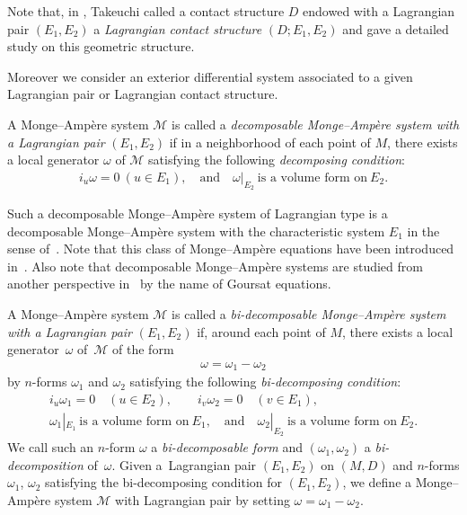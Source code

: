 \documentclass[pdftex]{sigma}
\begin{document}
Note that,
in \cite{Tak}, Takeuchi called
a contact structure $D$ endowed with a Lagrangian pair $(E_1,E_2)$
a {\it Lagrangian contact structure} $(D; E_1,E_2)$ and
gave a detailed study on this geometric structure.

Moreover we consider an exterior dif\/ferential system associated to a given
Lagrangian pair or Lagrangian contact structure.

\begin{Def}
A Monge--Amp{\`e}re system $\mathcal{M}$ is called
a {\it decomposable Monge--Amp{\`e}re system with a Lagrangian pair} $(E_1,E_2)$
if in a neighborhood of each point of $M$, there exists a local generator $\omega$
of $\mathcal{M}$
satisfying the following {\it decomposing condition}:
\begin{gather*}
i_u\omega = 0\ (u\in E_1), \quad \text{and} \quad
\omega\vert_{E_2}\ \text{is a volume form on}\ E_2.
\end{gather*}
\end{Def}

Such a decomposable Monge--Amp{\`e}re system
of Lagrangian type is a decomposable Monge--Amp{\`e}re system with
the characteristic system $E_1$ in the sense of~\cite{M-M}.
Note that this class of Monge--Amp{\`e}re equations have been introduced in~\cite{G}.
Also note that decomposable Monge--Amp{\`e}re systems are studied from another perspective in~\cite{A-B-M-P} by the name of Goursat equations.


\begin{Def}
A Monge--Amp{\`e}re system $\mathcal{M}$ is called
a {\it bi-decomposable Monge--Amp{\`e}re system with a Lagrangian pair} $(E_1,E_2)$
if, around each point of $M$, there exists a local generator~$\omega$
of~$\mathcal{M}$
of the form
\begin{gather*}
\omega=\omega_1-\omega_2
\end{gather*}
by $n$-forms $\omega_1$ and $\omega_2$
satisfying the following {\it bi-decomposing condition}:
\begin{gather*}
i_u\omega_1=0\quad (u\in E_2),\qquad i_v\omega_2=0\quad (v\in E_1),
\\
\omega_1| _{E_1}\ \text{is a volume form on}\ E_1,\quad
\mathrm{and}\quad \omega_2| _{E_2}\ \text{is a volume form on}\ E_2.
\end{gather*}
We call such an $n$-form $\omega$ a {\it bi-decomposable form} and
$(\omega_1, \omega_2)$ a {\it bi-decomposition} of~$\omega$.
Given a~Lagrangian pair $(E_1,E_2)$ on $(M, D)$ and $n$-forms $\omega_1$,
$\omega_2$ satisfying the bi-decomposing condition for $(E_1,E_2)$,
we def\/ine a Monge--Amp{\`e}re system
${\mathcal M}$ with Lagrangian pair
by setting $\omega = \omega_1-\omega_2$.
\end{Def}
\end{document}
